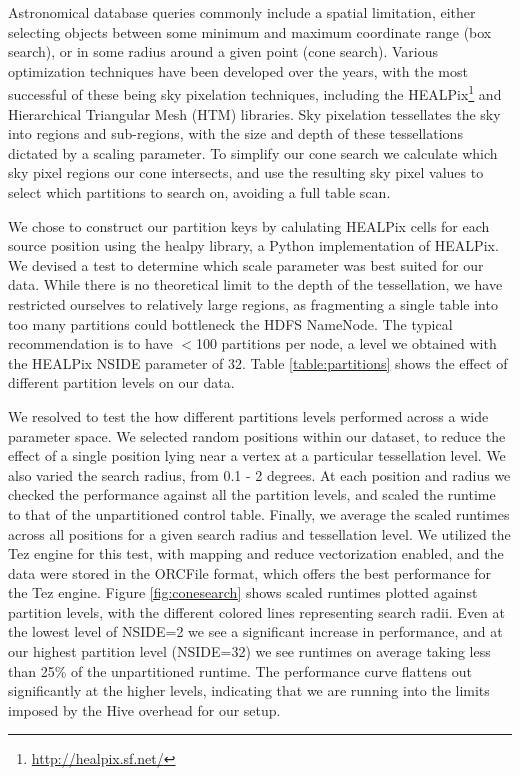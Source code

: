 \documentclass[11pt,twoside]{article}
\begin{document}
Astronomical database queries commonly include a spatial limitation, either selecting objects between some
minimum and maximum coordinate range (box search), or in some radius around a given point (cone
search). Various optimization techniques have been developed over the years, with the most successful of these
being sky pixelation techniques, including the HEALPix\footnote{\url{http://healpix.sf.net/}} and Hierarchical
Triangular Mesh (HTM) libraries. Sky pixelation tessellates the sky into regions and sub-regions, with the
size and depth of these tessellations dictated by a scaling parameter. To simplify our cone search we
calculate which sky pixel regions our cone intersects, and use the resulting sky pixel values to select which
partitions to search on, avoiding a full table scan.

We chose to construct our partition keys by calulating HEALPix cells for each source position using the healpy
library, a Python implementation of HEALPix. We devised a test to determine which scale parameter was best suited for our data.  While there is no theoretical limit to the depth of the tessellation, we have restricted ourselves to relatively large regions, as fragmenting a single table
into too many partitions could bottleneck the HDFS NameNode. The typical recommendation
is to have $<$100 partitions per node, a level we obtained with the HEALPix NSIDE parameter of 32. Table
\ref{table:partitions} shows the effect of different partition levels on our data.

We resolved to
test the how different partitions levels performed across a wide parameter space.  We selected random
positions within our dataset, to reduce the effect of a single position lying near a vertex at a particular
tessellation level. We also varied the search radius, from 0.1 - 2 degrees. At each position and radius we
checked the performance against all the partition levels, and scaled the runtime to that of the unpartitioned
control table.  Finally, we average the scaled runtimes across all positions for a given search radius and
tessellation level.  We utilized the Tez engine for this test, with mapping and reduce vectorization enabled,
and the data were stored in the ORCFile format, which offers the best performance for the Tez engine. Figure
\ref{fig:conesearch} shows scaled runtimes plotted against partition levels, with the different colored lines
representing search radii. Even at the lowest level of NSIDE=2 we see a significant increase in performance, and at our highest partition
level (NSIDE=32) we see runtimes on average taking less than 25\% of the unpartitioned runtime.  The
performance curve flattens out significantly at the higher levels, indicating that we are running into the
limits imposed by the Hive overhead for our setup.
\end{document}
